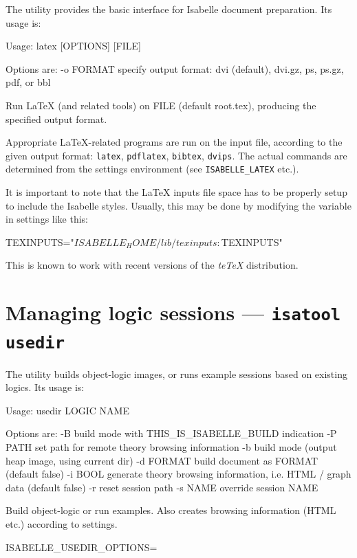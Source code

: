 The  utility provides the basic interface for Isabelle document
preparation.  Its usage is:
\begin{ttbox}
Usage: latex [OPTIONS] [FILE]

  Options are:
    -o FORMAT    specify output format: dvi (default), dvi.gz, ps,
                 ps.gz, pdf, or bbl

  Run LaTeX (and related tools) on FILE (default root.tex),
  producing the specified output format.
\end{ttbox}
Appropriate {\LaTeX}-related programs are run on the input file, according to
the given output format: \texttt{latex}, \texttt{pdflatex}, \texttt{bibtex},
\texttt{dvips}.  The actual commands are determined from the settings
environment (see \texttt{ISABELLE_LATEX} etc.).

It is important to note that the {\LaTeX} inputs file space has to be properly
setup to include the Isabelle styles.  Usually, this may be done by modifying
the  variable in settings like this:
\begin{ttbox}
TEXINPUTS="$ISABELLE_HOME/lib/texinputs:$TEXINPUTS"
\end{ttbox}
This is known to work with recent versions of the \textsl{teTeX} distribution.



\section{Managing logic sessions --- \texttt{isatool usedir}} \label{sec:tool-usedir}

The  utility builds object-logic images, or runs example
sessions based on existing logics. Its usage is:
\begin{ttbox}
Usage: usedir LOGIC NAME

  Options are:
    -B           build mode with THIS_IS_ISABELLE_BUILD indication
    -P PATH      set path for remote theory browsing information
    -b           build mode (output heap image, using current dir)
    -d FORMAT    build document as FORMAT (default false)
    -i BOOL      generate theory browsing information,
                 i.e. HTML / graph data (default false)
    -r           reset session path
    -s NAME      override session NAME

  Build object-logic or run examples. Also creates browsing
  information (HTML etc.) according to settings.

  ISABELLE_USEDIR_OPTIONS=
\end{ttbox}

